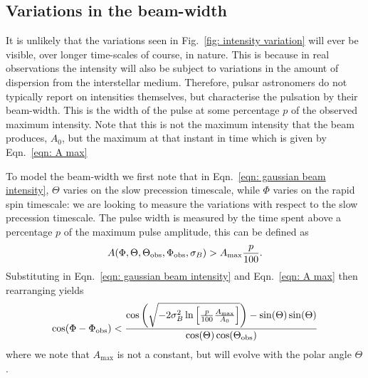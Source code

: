 \documentclass[../full_thesis/full_thesis.tex]{subfiles}
\begin{document}
\subsection{Variations in the beam-width}
It is unlikely that the variations seen in Fig.~\ref{fig: intensity variation}
will ever be visible, over longer time-scales of course, in nature. This is because
in real observations the intensity will also be subject to variations in the
amount of dispersion from the interstellar medium. Therefore, pulsar astronomers
do not typically report on intensities themselves, but characterise the pulsation
by their beam-width. This is the width of the pulse at some percentage $p$ of
the observed maximum intensity. Note that this is not the maximum intensity that
the beam produces, $A_0$, but the maximum at that instant in time which is
given by Eqn.~\eqref{eqn: A max}

To model the beam-width we first note that in Eqn.~\eqref{eqn: gaussian beam intensity},
$\Theta$ varies on the slow precession timescale, while $\Phi$ varies on the
rapid spin timescale: we are looking to measure the variations with respect to
the slow precession timescale.  The pulse width is measured by the time spent
above a percentage $p$ of the maximum pulse amplitude, this can be defined as
\begin{align}
A(\Phi, \Theta, \Theta_{\mathrm{obs}}, \Phi_{\mathrm{obs}}, \sigma_{B}) > A_{\textrm{max}} \frac{p}{100}.
\end{align}
Substituting in Eqn.~\eqref{eqn: gaussian beam intensity} and Eqn.~\eqref{eqn: A max}
then rearranging yields
\begin{equation}
\cos(\Phi - \Phi_{\mathrm{obs}}) < \frac{
\cos\left(
\sqrt{-2\sigma_{B}^{2} \ln\left[\frac{p}{100}\frac{A_\textrm{max}}{A_0}\right]}\right) - \sin(\Theta)\sin(\Theta)}
                          {\cos(\Theta)\cos(\Theta_{\mathrm{obs}})}
\label{eqn: 6737}
\end{equation}
where we note that $A_\textrm{max}$ is not a constant, but will evolve with the
polar angle $\Theta$.
\end{document}
